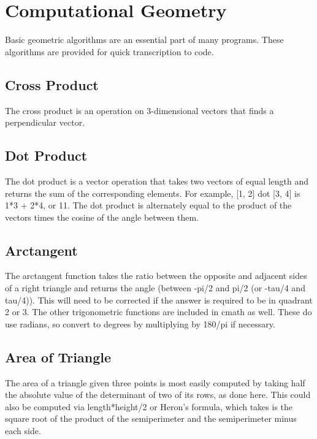 \section{Computational Geometry}
Basic geometric algorithms are an essential part of many programs. These algorithms are provided for quick transcription to code.

\subsection{Cross Product}
The cross product is an operation on 3-dimensional vectors that finds a perpendicular vector.

\subsection{Dot Product}
The dot product is a vector operation that takes two vectors of equal length and returns the sum of the corresponding elements. For example, [1, 2] dot [3, 4] is 1*3 + 2*4, or 11. The dot product is alternately equal to the product of the vectors times the cosine of the angle between them.

\subsection{Arctangent}
The arctangent function takes the ratio between the opposite and adjacent sides of a right triangle and returns the angle (between -pi/2 and pi/2 (or -tau/4 and tau/4)). This will need to be corrected if the answer is required to be in quadrant 2 or 3. The other trigonometric functions are included in cmath as well. These do use radians, so convert to degrees by multiplying by 180/pi if necessary.

\subsection{Area of Triangle}
The area of a triangle given three points is most easily computed by taking half the absolute value of the determinant of two of its rows, as done here. This could also be computed via length*height/2 or Heron's formula, which takes is the square root of the product of the semiperimeter and the semiperimeter minus each side.

